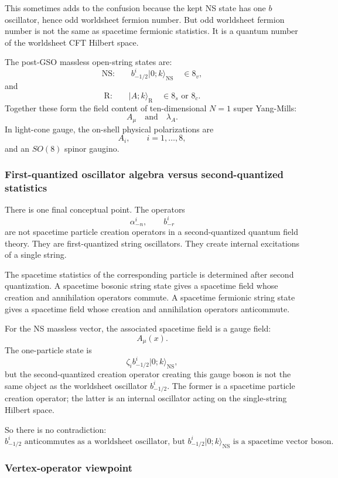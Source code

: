 \documentclass[
  10pt,
  a4paper,
  openany]{book}
\begin{document}
This sometimes adds to the confusion because the kept NS state has one
\(b\) oscillator, hence odd worldsheet fermion number. But odd
worldsheet fermion number is not the same as spacetime fermionic
statistics. It is a quantum number of the worldsheet CFT Hilbert space.

The post-GSO massless open-string states are: \[
\text{NS:}
\qquad
b_{-1/2}^i|0;k\rangle_{\text{NS}}
\quad
\in 8_v,
\] and \[
\text{R:}
\qquad
|A;k\rangle_{\text{R}}
\quad
\in 8_s
\text{ or }
8_c.
\] Together these form the field content of ten-dimensional \(N=1\)
super Yang-Mills: \[
A_\mu
\quad
\text{and}
\quad
\lambda_A.
\] In light-cone gauge, the on-shell physical polarizations are \[
A_i,
\qquad
i=1,\dots,8,
\] and an \(SO(8)\) spinor gaugino.

\subsubsection{First-quantized oscillator algebra versus
second-quantized
statistics}\label{first-quantized-oscillator-algebra-versus-second-quantized-statistics}

There is one final conceptual point. The operators \[
\alpha_{-n}^i,
\qquad
b_{-r}^i
\] are not spacetime particle creation operators in a second-quantized
quantum field theory. They are first-quantized string oscillators. They
create internal excitations of a single string.

The spacetime statistics of the corresponding particle is determined
after second quantization. A spacetime bosonic string state gives a
spacetime field whose creation and annihilation operators commute. A
spacetime fermionic string state gives a spacetime field whose creation
and annihilation operators anticommute.

For the NS massless vector, the associated spacetime field is a gauge
field: \[
A_\mu(x).
\] The one-particle state is \[
\zeta_i b_{-1/2}^i|0;k\rangle_{\text{NS}},
\] but the second-quantized creation operator creating this gauge boson
is not the same object as the worldsheet oscillator \(b_{-1/2}^i\). The
former is a spacetime particle creation operator; the latter is an
internal oscillator acting on the single-string Hilbert space.

So there is no contradiction: \[
\boxed{
b_{-1/2}^i
\text{ anticommutes as a worldsheet oscillator, but }
b_{-1/2}^i|0;k\rangle_{\text{NS}}
\text{ is a spacetime vector boson.}
}
\]

\subsubsection{Vertex-operator
viewpoint}\label{vertex-operator-viewpoint}
\end{document}
